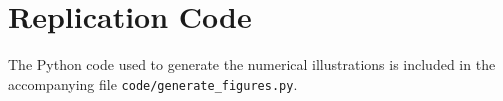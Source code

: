 \documentclass[12pt]{article}
\begin{document}
\appendix
\section{Replication Code}

The Python code used to generate the numerical illustrations is included in the accompanying file \texttt{code/generate\_figures.py}.
\end{document}
